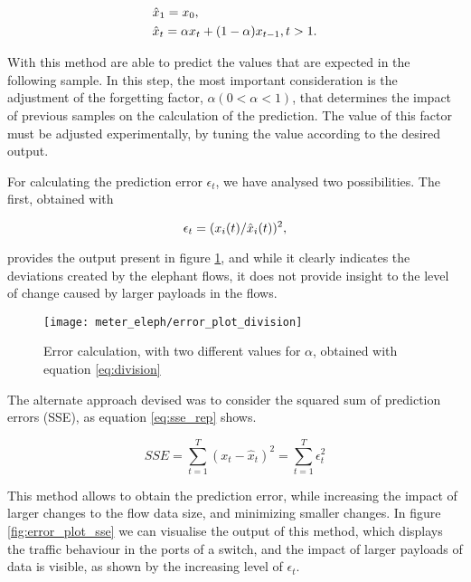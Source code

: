 \begin{equation}
    \centering
        \begin {split}
            &\hat{x}_1 = x_0, \\
            &\hat{x}_t = \alpha x_{t} + (1-\alpha)x_{t-1}, t > 1.
        \end {split}
    \label{eq:exp_smooth_rep}
\end{equation}

\par With this method are able to predict the values that are expected in the following sample. In this step, the most important consideration is the adjustment of 
the forgetting factor, $\alpha (0 < \alpha < 1)$, that determines the impact of previous samples on the calculation of the prediction. The value of this factor must
be adjusted experimentally, by tuning the value according to the desired output.

\par For calculating the prediction error $\epsilon_t$, we have analysed two possibilities. The first, obtained with

\begin{equation}
    \centering
    \label{eq:division}
    \epsilon_t = (x_i(t)/\hat{x}_i(t))^2,
\end{equation}

\par provides the output present in figure \ref{fig:error_plot_division}, and while it clearly indicates the deviations created by the elephant flows, it 
does not provide insight to the level of change caused by larger payloads in the flows.

\begin{figure}[H]
    \texttt{[image: meter\_eleph/error\_plot\_division]}
    \caption{Error calculation, with two different values for $\alpha$, obtained with equation \ref{eq:division}}
    \label{fig:error_plot_division}
\end{figure}

\par The alternate approach devised was to consider the squared sum of prediction errors (SSE), as equation \ref{eq:sse_rep} shows. 

\begin {equation} 
    \label{eq:sse_rep}
    SSE = \sum_{t=1}^T{(x_t-\hat{x}_{t})^2} = \sum_{t=1}^T{\epsilon_t^2}
\end {equation}

This method allows to obtain the prediction error, while increasing the impact of larger changes to the flow data size, and minimizing smaller changes. In figure
\ref{fig:error_plot_sse} we can visualise the output of this method, which displays the traffic behaviour in the ports of a switch, and the impact of larger payloads
of data is visible, as shown by the increasing level of $\epsilon_t$.

